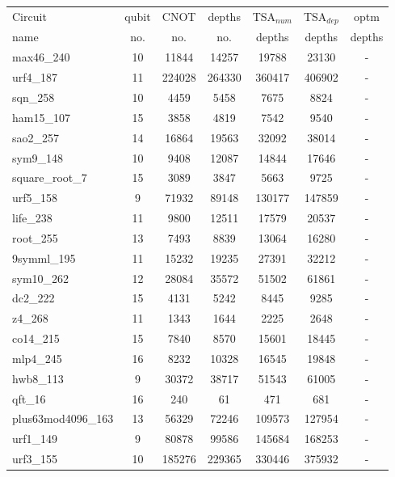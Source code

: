 \documentclass[journal]{IEEEtran}
\begin{document}
                        \begin{table*}[!th]
                          \begin{center}
                            \begin{tabular}{|p{4.3cm}<{\centering}|c|c|c|c|c|c|}
                            \hline
                            Circuit &  qubit  & CNOT &depths &TSA$_{num}$& TSA$_{dep}$  & optm 	  	\\
                            name	&   no. 	&	no. & no. & depths&  depths &  depths 	\\
                           \hline
                           max46\_240 & 10 & 11844 & 14257 & 19788 & 23130 & - \\ 
urf4\_187 & 11 & 224028 & 264330 & 360417 & 406902 & - \\ 
sqn\_258 & 10 & 4459 & 5458 & 7675 & 8824 & - \\ 
ham15\_107 & 15 & 3858 & 4819 & 7542 & 9540 & - \\ 
sao2\_257 & 14 & 16864 & 19563 & 32092 & 38014 & - \\ 
sym9\_148 & 10 & 9408 & 12087 & 14844 & 17646 & - \\ 
square\_root\_7 & 15 & 3089 & 3847 & 5663 & 9725 & - \\ 
urf5\_158 & 9 & 71932 & 89148 & 130177 & 147859 & - \\ 
life\_238 & 11 & 9800 & 12511 & 17579 & 20537 & - \\ 
root\_255 & 13 & 7493 & 8839 & 13064 & 16280 & - \\ 
9symml\_195 & 11 & 15232 & 19235 & 27391 & 32212 & - \\ 
sym10\_262 & 12 & 28084 & 35572 & 51502 & 61861 & - \\ 
dc2\_222 & 15 & 4131 & 5242 & 8445 & 9285 & - \\ 
z4\_268 & 11 & 1343 & 1644 & 2225 & 2648 & - \\ 
co14\_215 & 15 & 7840 & 8570 & 15601 & 18445 & - \\ 
mlp4\_245 & 16 & 8232 & 10328 & 16545 & 19848 & - \\ 
hwb8\_113 & 9 & 30372 & 38717 & 51543 & 61005 & - \\ 
qft\_16 & 16 & 240 & 61 & 471 & 681 & - \\ 
plus63mod4096\_163 & 13 & 56329 & 72246 & 109573 & 127954 & - \\ 
urf1\_149 & 9 & 80878 & 99586 & 145684 & 168253 & - \\ 
urf3\_155 & 10 & 185276 & 229365 & 330446 & 375932 & - \\ 

\end{tabular}
\end{center}
\end{table*}
\end{document}

